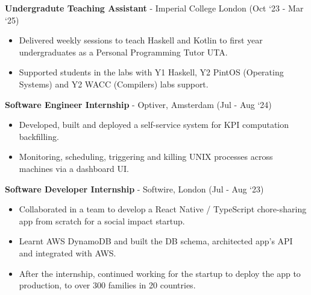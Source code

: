 \documentclass{Resume}
\begin{document}
\vspace{0.8em}

\textbf{Undergradute Teaching Assistant} - Imperial College London  \hfill (Oct `23 - Mar `25)
{\small
    \begin{itemize}[label=--]
        \item Delivered weekly sessions to teach Haskell and Kotlin to  first year undergraduates as a Personal Programming Tutor UTA.
        \item Supported students in the labs with Y1 Haskell, Y2 PintOS (Operating Systems) and Y2 WACC (Compilers) labs support.
    \end{itemize}
}
\vspace{0.8em}

\textbf{Software Engineer Internship} - Optiver, Amsterdam \hfill (Jul - Aug `24)
    {\small
        \begin{itemize}[label=--]
            \item Developed, built and deployed a self-service system for KPI computation backfilling.
            \item Monitoring, scheduling, triggering and killing UNIX processes across machines via a dashboard UI.
        \end{itemize}
    }
\vspace{0.8em}

\textbf{Software Developer Internship} - Softwire, London \hfill (Jul - Aug `23)
{\small
\begin{itemize}[label=--]
    \item Collaborated in a team to develop a React Native / TypeScript chore-sharing app from scratch for a social impact startup.
    \item Learnt AWS DynamoDB and built the DB schema, architected app's API and integrated with AWS.
    \item After the internship, continued working for the startup to deploy the app to production, to over 300 families in 20 countries.  
\end{itemize}
}    
				

\vspace{-2em}
\end{document}
